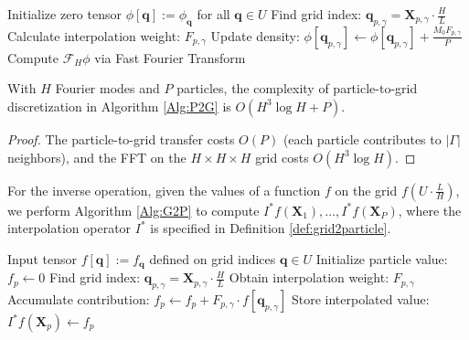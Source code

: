 \documentclass[review,onefignum,onetabnum]{siamart250211}
\begin{document}
\begin{algorithm}
\caption{Particle-to-Grid discretization}
\label{Alg:P2G}
\begin{algorithmic}[1]
    \State Initialize zero tensor \(\phi[\mathbf{q}]:= \phi_\mathbf{q}\) for all \(\mathbf{q} \in U\)
        \For{\(\gamma \in \Gamma\)}
            \State Find grid index: \(\mathbf{q}_{p,\gamma} = \mathbf{X}_{p,\gamma} \cdot \frac{H}{L} \) 
            \State Calculate interpolation weight: \(F_{p,\gamma}\)
            \State Update density: \(\phi[\mathbf{q}_{p,\gamma}] \leftarrow \phi[\mathbf{q}_{p,\gamma}] + \frac{M_0 F_{p,\gamma}}{P}\)
        \EndFor
    \EndFor
    \State Compute \(\mathcal{F}_H \phi\) via Fast Fourier Transform
\end{algorithmic}
\end{algorithm}
\begin{lemma} With $H$ Fourier modes and $P$ particles, 
the complexity of particle-to-grid discretization in Algorithm  \ref{Alg:P2G} is \( O(H^3 \log H + P) \). 
\end{lemma}
\begin{proof}
The particle-to-grid transfer costs \( O(P) \) (each particle contributes to \(|\Gamma|\) neighbors), and the FFT on the \(H \times H \times H\) grid costs \( O(H^3 \log H) \).
\end{proof}

For the inverse operation, given the values of a function \( f \) on the grid \( f\left(U \cdot \frac{L}{H}\right) \), we perform Algorithm \ref{Alg:G2P} to compute \( I^* f(\mathbf{X}_1), \ldots, I^* f(\mathbf{X}_P) \), where the interpolation operator $I^*$ is specified in Definition \ref{def:grid2particle}.
\begin{algorithm}
\caption{Grid-to-Particle interpolation}
\label{Alg:G2P}
\begin{algorithmic}[1]
    \State Input tensor \(f[\mathbf{q}]:= f_{\mathbf{q}}\) defined on grid indices \(\mathbf{q} \in U\)
        \State Initialize particle value: \(f_p \leftarrow 0\)
        \For{\(\gamma \in \Gamma\)} 
            \State Find grid index: \(\mathbf{q}_{p,\gamma} = \mathbf{X}_{p,\gamma} \cdot \frac{H}{L}\)
            \State Obtain interpolation weight: \(F_{p,\gamma}\)
            \State Accumulate contribution: \(f_p \leftarrow f_p + F_{p,\gamma} \cdot f[\mathbf{q}_{p,\gamma}]\)
        \EndFor
        \State Store interpolated value: \(I^*  f(\mathbf{X}_p) \leftarrow f_p\)
    \EndFor
\end{algorithmic}
\end{algorithm}
\end{document}
